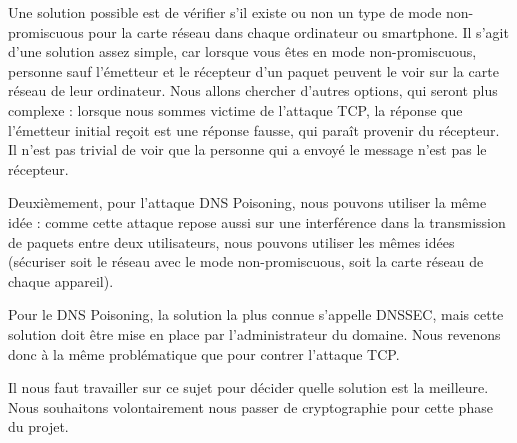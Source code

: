 \documentclass[a4paper, 12pt,twoside]{article}
\begin{document}
	Une solution possible est de vérifier s’il existe ou non un type de mode non-promiscuous pour la carte réseau dans chaque ordinateur ou smartphone. Il s'agit d'une solution assez simple, car lorsque vous êtes en mode non-promiscuous, personne sauf l'émetteur et le récepteur d’un paquet peuvent le voir sur la carte réseau de leur ordinateur. Nous allons chercher d’autres options, qui seront plus complexe :  lorsque nous sommes victime de l’attaque TCP, la réponse que l'émetteur initial reçoit est une réponse fausse, qui paraît provenir du récepteur. Il n'est pas trivial de voir que la personne qui a envoyé le message n’est pas le récepteur. 

	Deuxièmement, pour l’attaque DNS Poisoning, nous pouvons utiliser la même idée : comme cette attaque repose aussi sur une  interférence dans la transmission de paquets entre deux utilisateurs, nous pouvons utiliser les mêmes idées (sécuriser soit le réseau avec le mode non-promiscuous, soit la carte réseau de chaque appareil).

	Pour le DNS Poisoning, la solution la plus connue s’appelle DNSSEC, mais cette solution doit être mise en place par l'administrateur du domaine. Nous revenons donc à la même problématique que pour contrer l'attaque TCP.

	Il nous faut travailler sur ce sujet pour décider quelle solution est la meilleure. Nous souhaitons volontairement nous passer de cryptographie pour cette phase du projet.




\end{document}
